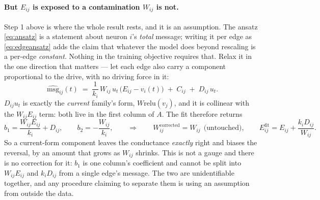 \documentclass[11pt,a4paper]{article}
\newcommand{\vj}{v_j}
\newcommand{\vi}{v_i}
\newcommand{\Wij}{W_{ij}}
\newcommand{\Eij}{E_{ij}}
\newcommand{\msg}{\mathrm{msg}}
\newcommand{\act}{\mathrm{relu}}
\begin{document}
\paragraph{But $\Eij$ is exposed to a contamination $\Wij$ is not.} Step 1 above
is where the whole result rests, and it is an assumption. The ansatz
\eqref{eq:ansatz} is a statement about neuron $i$'s \emph{total} message; writing
it per edge as \eqref{eq:edgeansatz} adds the claim that whatever the model does
beyond rescaling is a per-edge \emph{constant}. Nothing in the training
objective requires that. Relax it in the one direction that matters --- let each
edge also carry a component proportional to the drive, with no driving force in
it:
%
\begin{equation}
\widehat{\msg}_{ij}(t) \;=\; \frac{1}{k_i}\,\Wij\,u_t\,\bigl(\Eij - \vi(t)\bigr)
   \;+\; C_{ij} \;+\; D_{ij}\,u_t .
\label{eq:contam}
\end{equation}
%
$D_{ij} u_t$ is exactly the \emph{current} family's form, $W \act(\vj)$, and it
is collinear with the $\Wij\Eij$ term: both live in the first column of $A$. The
fit therefore returns
%
\begin{equation}
b_1 = \frac{\Wij\Eij}{k_i} + D_{ij}, \qquad b_2 = -\frac{\Wij}{k_i},
\qquad\Longrightarrow\qquad
\Wij^{\mathrm{corrected}} = \Wij \ \ \text{(untouched)}, \qquad
\Eij^{\mathrm{fit}} = \Eij + \frac{k_i D_{ij}}{\Wij}.
\label{eq:Ebias}
\end{equation}
%
So a current-form component leaves the conductance \emph{exactly} right and
biases the reversal, by an amount that grows as $\Wij$ shrinks. This is not a
gauge and there is no correction for it: $b_1$ is one column's coefficient and
cannot be split into $\Wij\Eij$ and $k_i D_{ij}$ from a single edge's message.
The two are unidentifiable together, and any procedure claiming to separate them
is using an assumption from outside the data.
\end{document}
